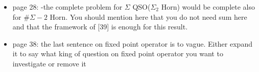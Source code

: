 \documentclass[a4paper]{article}
\begin{document}
\begin{itemize}
	\item page 28:	-the complete problem for $\Sigma$ QSO($\Sigma_2$ Horn) would be complete also for $\#\Sigma-2$ Horn. You should mention here that you do not need sum here	and that the framework of [39] is enough for this result.
	\item page 38: the last sentence on fixed point operator is to vague. Either expand it to say what king of question on fixed point operator you want to investigate or remove it	
\end{itemize}

	
\end{document}

